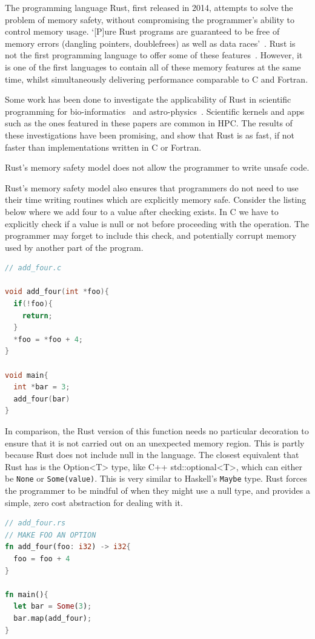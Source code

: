 \documentclass{report}[a4]
\begin{document}
The programming language Rust, first released in 2014, attempts to solve the problem of memory safety, without compromising the programmer's ability to control memory usage. `[P]ure Rust programs are guaranteed to be free of memory errors (dangling pointers, doublefrees) as well as data races'~\cite{Matsakis:2014}. Rust is not the first programming language to offer some of these features~\cite{Manson:2005:JMM:1047659.1040336, pygc, jones1996concurrent}. However, it is one of the first languages to contain all of these memory features at the same time, whilst simultaneously delivering performance comparable to C and Fortran.

Some work has been done to investigate the applicability of Rust in scientific programming for bio-informatics~\cite{bioinformatics} and astro-physics~\cite{blanco-cuaresma_bolmont_2016}. Scientific kernels and apps such as the ones featured in these papers are common in HPC. The results of these investigations have been promising, and show that Rust is as fast, if not faster than implementations written in C or Fortran.

Rust's memory safety model does not allow the programmer to write unsafe code.

Rust's memory safety model also ensures that programmers do not need to use their time writing routines which are explicitly memory safe. Consider the listing below where we add four to a value after checking exists. In C we have to explicitly check if a value is null or not before proceeding with the operation. The programmer may forget to include this check, and potentially corrupt memory used by another part of the program.

\begin{lstlisting}[language=C]
// add_four.c

void add_four(int *foo){
  if(!foo){
    return;
  }
  *foo = *foo + 4;
}

void main{
  int *bar = 3;
  add_four(bar)
}
\end{lstlisting}
In comparison, the Rust version of this function needs no particular decoration to ensure that it is not carried out on an unexpected memory region. This is partly because Rust does not include null in the language. The closest equivalent that Rust has is the Option<T> type, like C++ std::optional<T>, which can either be \texttt{None} or \texttt{Some(value)}. This is very similar to Haskell's \texttt{Maybe} type. Rust forces the programmer to be mindful of when they might use a null type, and provides a simple, zero cost abstraction for dealing with it.
\begin{lstlisting}[language=Rust]
// add_four.rs
// MAKE FOO AN OPTION
fn add_four(foo: i32) -> i32{
  foo = foo + 4
}

fn main(){
  let bar = Some(3);
  bar.map(add_four);
}
\end{lstlisting}
\end{document}
